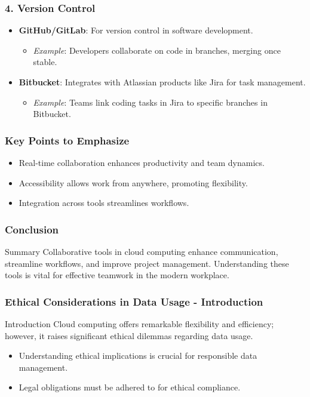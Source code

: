 \documentclass[aspectratio=169]{beamer}
\begin{document}
\begin{frame}[fragile]
    \frametitle{4. Version Control}
    \begin{itemize}
        \item \textbf{GitHub/GitLab}: For version control in software development.
        \begin{itemize}
            \item \textit{Example}: Developers collaborate on code in branches, merging once stable.
        \end{itemize}
        \item \textbf{Bitbucket}: Integrates with Atlassian products like Jira for task management.
        \begin{itemize}
            \item \textit{Example}: Teams link coding tasks in Jira to specific branches in Bitbucket.
        \end{itemize}
    \end{itemize}
\end{frame}

\begin{frame}[fragile]
    \frametitle{Key Points to Emphasize}
    \begin{itemize}
        \item Real-time collaboration enhances productivity and team dynamics.
        \item Accessibility allows work from anywhere, promoting flexibility.
        \item Integration across tools streamlines workflows.
    \end{itemize}
\end{frame}

\begin{frame}[fragile]
    \frametitle{Conclusion}
    \begin{block}{Summary}
        Collaborative tools in cloud computing enhance communication, streamline workflows, and improve project management. Understanding these tools is vital for effective teamwork in the modern workplace.
    \end{block}
\end{frame}

\begin{frame}[fragile]
    \frametitle{Ethical Considerations in Data Usage - Introduction}
    \begin{block}{Introduction}
        Cloud computing offers remarkable flexibility and efficiency; however, it raises significant ethical dilemmas regarding data usage. 
        \begin{itemize}
            \item Understanding ethical implications is crucial for responsible data management.
            \item Legal obligations must be adhered to for ethical compliance.
        \end{itemize}
    \end{block}
\end{frame}
\end{document}
